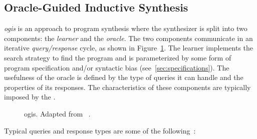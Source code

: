 \subsection{Oracle-Guided Inductive Synthesis}
\label{sec:ogis}

\textit{\Gls{ogis}} is an approach to program synthesis where the synthesizer is
split into two components: the \textit{learner} and the \textit{oracle}. The two
components communicate in an iterative \textit{query/response} cycle, as shown
in Figure~\ref{fig:ogis}. The learner implements the search strategy to
find the program and is parameterized by some form of program specification
and/or syntactic bias (see~\ref{sec:specifications}). The usefulness of the
oracle is defined by the type of queries it can handle and the properties of its
responses. The characteristics of these components are typically imposed by the
.

\begin{figure}[htb]
  \centering
  \caption{\Acrlong{ogis}. Adapted from
    \protect\citeauthor{Jha:2017:TFS}~\protect\cite{Jha:2017:TFS}.}
  \label{fig:ogis}
\end{figure}

Typical queries and response types are some of the following~\cite{Jha:2017:TFS}:

